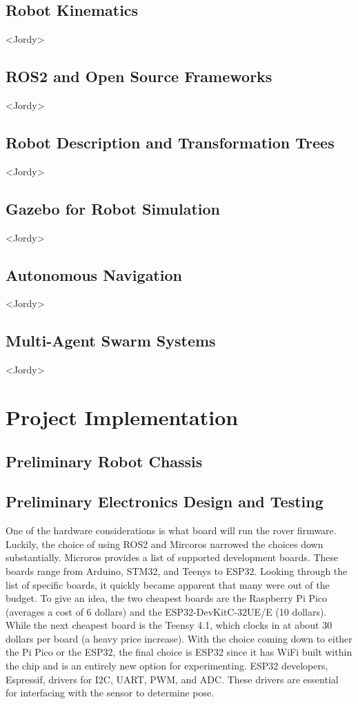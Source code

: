 \documentclass[conference]{IEEEtran}
\begin{document}
\subsection{Robot Kinematics} <Jordy>

\subsection{ROS2 and Open Source Frameworks} <Jordy>

\subsection{Robot Description and Transformation Trees} <Jordy>

\subsection{Gazebo for Robot Simulation} <Jordy>

\subsection{Autonomous Navigation} <Jordy>

\subsection{Multi-Agent Swarm Systems} <Jordy>

\section{Project Implementation}
\subsection{Preliminary Robot Chassis}

\subsection{Preliminary Electronics Design and Testing}
One of the hardware considerations is what board will run the rover firmware. Luckily, the choice of using ROS2 and Mircoros narrowed the choices down substantially. Microros provides a list of supported development boards. These boards range from Arduino, STM32, and Teenys to ESP32. Looking through the list of specific boards, it quickly became apparent that many were out of the budget. To give an idea, the two cheapest boards are the Raspberry Pi Pico (averages a cost of 6 dollars) and the ESP32-DevKitC-32UE/E (10 dollars). While the next cheapest board is the Teensy 4.1, which clocks in at about 30 dollars per board (a heavy price increase). With the choice coming down to either the Pi Pico or the ESP32, the final choice is ESP32 since it has WiFi built within the chip and is an entirely new option for experimenting. ESP32 developers, Espressif, drivers for I2C, UART, PWM, and ADC. These drivers are essential for interfacing with the sensor to determine pose.
\end{document}

